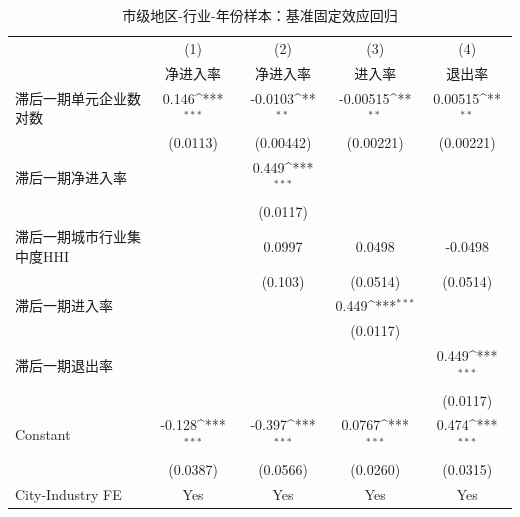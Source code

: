 \begin{table}[htbp]\centering
\def\sym#1{\ifmmode^{#1}\else\(^{#1}\)\fi}
\caption{市级地区-行业-年份样本：基准固定效应回归}
\begin{tabular}{l*{4}{c}}
\toprule
                    &\multicolumn{1}{c}{(1)}&\multicolumn{1}{c}{(2)}&\multicolumn{1}{c}{(3)}&\multicolumn{1}{c}{(4)}\\
                    &\multicolumn{1}{c}{净进入率}&\multicolumn{1}{c}{净进入率}&\multicolumn{1}{c}{进入率}&\multicolumn{1}{c}{退出率}\\
\midrule
滞后一期单元企业数对数&       0.146\sym{***}&     -0.0103\sym{**} &    -0.00515\sym{**} &     0.00515\sym{**} \\
                    &    (0.0113)         &   (0.00442)         &   (0.00221)         &   (0.00221)         \\
\addlinespace
滞后一期净进入率    &                     &       0.449\sym{***}&                     &                     \\
                    &                     &    (0.0117)         &                     &                     \\
\addlinespace
滞后一期城市行业集中度HHI&                     &      0.0997         &      0.0498         &     -0.0498         \\
                    &                     &     (0.103)         &    (0.0514)         &    (0.0514)         \\
\addlinespace
滞后一期进入率      &                     &                     &       0.449\sym{***}&                     \\
                    &                     &                     &    (0.0117)         &                     \\
\addlinespace
滞后一期退出率      &                     &                     &                     &       0.449\sym{***}\\
                    &                     &                     &                     &    (0.0117)         \\
\addlinespace
Constant            &      -0.128\sym{***}&      -0.397\sym{***}&      0.0767\sym{***}&       0.474\sym{***}\\
                    &    (0.0387)         &    (0.0566)         &    (0.0260)         &    (0.0315)         \\
\midrule
City-Industry FE    &         Yes         &         Yes         &         Yes         &         Yes         \\

\end{tabular}
\end{table}
